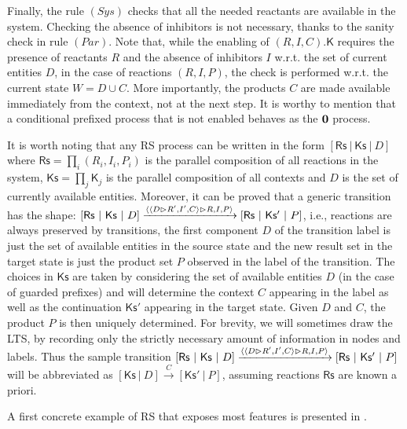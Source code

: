 Finally, the rule $(\textit{Sys})$ checks that all the needed reactants are available in the system. Checking the absence of inhibitors  is not necessary, thanks to the sanity check in rule $(\textit{Par})$.
Note that, while the enabling of $(R,I,C).\mathsf{K}$ requires the presence of reactants $R$ and the absence of inhibitors $I$ w.r.t. the set of current entities $D$, in the case of reactions $(R,I,P)$, the check is performed w.r.t. the current state $W=D\cup C$.
More importantly, the products $C$ are made available immediately from the context, not at the next step.
It is worthy to mention that a conditional prefixed process that is not enabled behaves as the $\mathbf{0}$ process.

\begin{remark}\label{rem:shortlts}
It is worth noting that any RS process can be written in the form $[\mathsf{Rs}~|~\mathsf{Ks}~|~D]$ where $\mathsf{Rs}=\prod_i (R_i,I_i,P_i)$ is the parallel composition of all reactions in the system, $\mathsf{Ks}=\prod_j \mathsf{K}_j$ is the parallel composition of all contexts and $D$ is the set of currently available entities. 
Moreover, it can be proved that a generic transition has the shape:
$[\mathsf{Rs}~|~\mathsf{Ks}~|~D]\xrightarrow{\langle \langle D\vartriangleright R',I',C\rangle\vartriangleright R,I,P\rangle}[\mathsf{Rs}~|~\mathsf{Ks'}~|~P]$,
i.e., reactions are always preserved by transitions, the first component $D$ of the transition label is just the set of available entities in the source state and the new result set in the target state is just the product set $P$ observed in the label of the transition. The choices in $\mathsf{Ks}$ are taken by considering the set of available entities $D$ (in the case of guarded prefixes) and will determine the context $C$ appearing in the label as well as the continuation $\mathsf{Ks'}$ appearing in the target state. Given $D$ and $C$, the product $P$ is then uniquely determined. For brevity, we will sometimes draw the LTS, by recording only the strictly necessary amount of information in nodes and labels. Thus the sample transition  $[\mathsf{Rs}~|~\mathsf{Ks}~|~D]\xrightarrow{\langle \langle D\vartriangleright R',I',C\rangle\vartriangleright R,I,P\rangle}[\mathsf{Rs}~|~\mathsf{Ks'}~|~P]$ will be abbreviated as $[\mathsf{Ks}~|~D]\xrightarrow{C}[\mathsf{Ks'}~|~P]$, assuming reactions $\mathsf{Rs}$ are known a priori.
\end{remark}

A first concrete example of RS that exposes most features is presented in .

